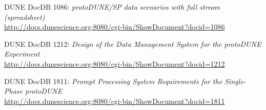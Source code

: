 \documentclass[pdftex,12pt,letter]{article}
\begin{document}
\begin{thebibliography}{1}
{DUNE DocDB 1086: \textit{ protoDUNE/SP data scenarios with full stream (spreadsheet)}}\\
\url{http://docs.dunescience.org:8080/cgi-bin/ShowDocument?docid=1086}





{DUNE DocDB 1212: \textit{Design of the Data Management System for the protoDUNE Experiment}}\\
\url{http://docs.dunescience.org:8080/cgi-bin/ShowDocument?docid=1212}

{DUNE DocDB 1811: \textit{Prompt Processing System Requirements for the Single-Phase protoDUNE}}\\
\url{http://docs.dunescience.org:8080/cgi-bin/ShowDocument?docid=1811}


\end{thebibliography}
\end{document}
